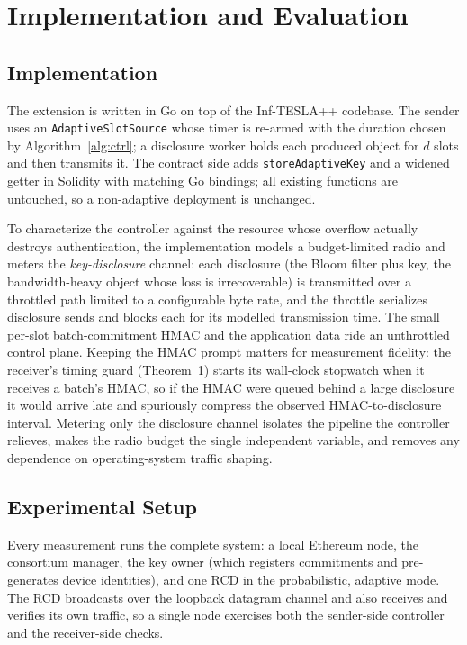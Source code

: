 \documentclass[conference]{IEEEtran}
\begin{document}
\section{Implementation and Evaluation}\label{sec:results}

\subsection{Implementation}
The extension is written in Go on top of the Inf-TESLA++ codebase. The sender
uses an \texttt{AdaptiveSlotSource} whose timer is re-armed with the duration
chosen by Algorithm~\ref{alg:ctrl}; a disclosure worker holds each produced
object for $d$ slots and then transmits it. The contract side adds
\texttt{storeAdaptiveKey} and a widened getter in Solidity with matching Go
bindings; all existing functions are untouched, so a non-adaptive deployment is
unchanged.

To characterize the controller against the resource whose overflow actually
destroys authentication, the implementation models a budget-limited radio and
meters the \emph{key-disclosure} channel: each disclosure (the Bloom filter plus
key, the bandwidth-heavy object whose loss is irrecoverable) is transmitted over
a throttled path limited to a configurable byte rate, and the throttle serializes
disclosure sends and blocks each for its modelled transmission time. The small
per-slot batch-commitment HMAC and the application data ride an unthrottled
control plane. Keeping the HMAC prompt matters for measurement fidelity: the
receiver's timing guard (Theorem~1) starts its wall-clock
stopwatch when it receives a batch's HMAC, so if the HMAC were queued behind a
large disclosure it would arrive late and spuriously compress the observed
HMAC-to-disclosure interval. Metering only the disclosure channel isolates the
pipeline the controller relieves, makes the radio budget the single independent
variable, and removes any dependence on operating-system traffic shaping.

\subsection{Experimental Setup}
Every measurement runs the complete system: a local Ethereum node, the consortium
manager, the key owner (which registers commitments and pre-generates device
identities), and one RCD in the probabilistic, adaptive mode. The RCD broadcasts
over the loopback datagram channel and also receives and verifies its own
traffic, so a single node exercises both the sender-side controller and the
receiver-side checks.
\end{document}
